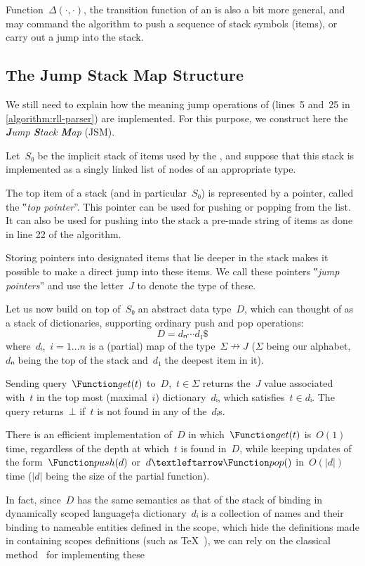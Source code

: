 Function~$Δ(·,·)$, the transition function of an \RLLp is also a bit more
general, and may command the algorithm to push a sequence of stack symbols
(items), or carry out a jump into the stack.

\subsection{The Jump Stack Map Structure}
\label{section:jump}
We still need to explain how the meaning jump operations of \RLLp (lines~5
and~25 in \cref{algorithm:rll-parser}) are implemented. For this purpose, we
construct here the \emph{\textbf Jump \textbf Stack \textbf Map} (JSM).

Let~$S₀$ be the implicit stack of items used by the \RLLp, and suppose that
this stack is implemented as a singly linked list of nodes of an appropriate
type.

The top item of a stack (and in particular~$S₀$) is represented by a pointer,
called the ‟\emph{top pointer}”. This pointer can be used for pushing or
popping from the list. It can also be used for pushing into the stack a
pre-made string of items as done in line 22 of the \RLLp algorithm.

Storing pointers into designated items that lie deeper in the stack makes it
possible to make a direct jump into these items. We call these pointers
‟\emph{jump pointers}” and use the letter~$J$ to denote the type of these.

Let us now build on top of~$S₀$ an abstract data type~$D$, which can thought of
as a stack of dictionaries, supporting ordinary push and pop operations:
\[
  D=dₙ⋯d₁\$
\]
where~$dᵢ$,~$i=1…n$ is a (partial) map of the type~$Σ↛J$ ($Σ$ being our
alphabet,~$dₙ$ being the top of the stack and~$d₁$ the deepest item in it).

Sending query~$\Function get(t)$ to~$D$,~$t∈Σ$ returns the~$J$ value
associated with~$t$ in the top most (maximal~$i$) dictionary~$dᵢ$, which
satisfies~$t∈dᵢ$. The query returns~$⊥$ if~$t$ is not found in any of
the~$dᵢ$s.

There is an efficient implementation of~$D$ in which~$\Function get(t)$
is~$O(1)$ time, regardless of the depth at which~$t$ is found in~$D$, while
keeping updates of the form~$\Function push(d)$ or~$d←\Function pop()$
in~$O(|d|)$ time ($|d|$ being the size of the partial function).

In fact, since~$D$ has the same semantics as that of the stack of binding in
dynamically scoped language†{a dictionary~$dᵢ$ is a collection of
  names and their binding to nameable entities defined in the scope, which hide
the definitions made in containing scopes} definitions (such as
\TeX~\cite{TeX:79}), we can rely on the classical method~\cite{Schoe:95} for
implementing these

